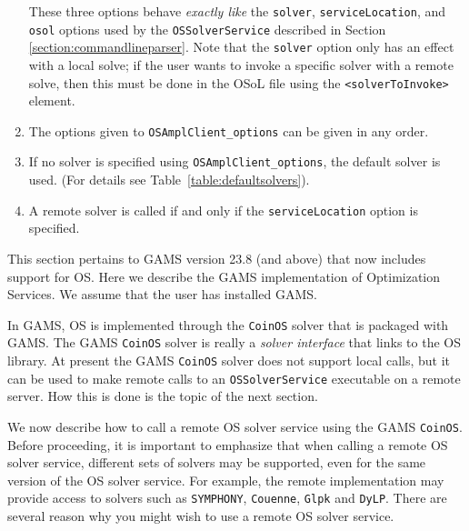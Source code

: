 \begin{enumerate}
These three options behave {\it exactly like} the {\tt solver}, {\tt serviceLocation}, and {\tt osol} options used by the {\tt OSSolverService} described in  Section \ref{section:commandlineparser}.
Note that the {\tt solver} option only has an effect with a local solve; 
if the user wants to invoke a specific solver with a remote solve, then this must be done in the OSoL file using the {\tt <solverToInvoke>} element.

\item  The options given to {\tt OSAmplClient\_options}  can be given in any order.

\item If no solver is specified using {\tt OSAmplClient\_options},  the default solver is used.
(For details see Table~\ref{table:defaultsolvers}).

\item A remote solver is called if and only if the {\tt serviceLocation} option is specified.

\end{enumerate}




\label{section:gamslinks}


This section pertains to GAMS version 23.8 (and above) that now includes support for OS.  
Here we describe the GAMS  implementation of Optimization Services.  We assume that the user has installed GAMS.

In GAMS, OS is implemented through the {\tt CoinOS} solver that is packaged with GAMS.      
The GAMS {\tt CoinOS} solver is really a {\it solver interface} that links to the OS library.
At present the GAMS  {\tt CoinOS} solver does not support local calls, but it can be used to make
remote calls to an {\tt OSSolverService} executable on a remote server. How this is done is the topic of the next section.



\label{section:gamsremote}

We now describe how to call  a remote OS   solver service using the GAMS {\tt CoinOS}.  Before proceeding, 
it is important to emphasize that when calling a remote OS solver service, different sets of solvers may be supported, even for the same version of the OS solver service. 
For example, the remote 
implementation may provide access to solvers such as {\tt SYMPHONY}, {\tt Couenne}, {\tt Glpk} and {\tt DyLP}.  
There are several reason why you might wish to use a remote OS solver service. 


